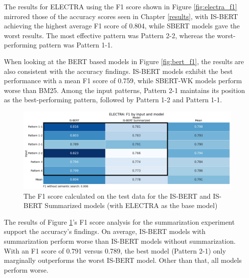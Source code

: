 The results for ELECTRA using the F1 score shown in Figure \ref{fig:electra_f1} mirrored those of the accuracy scores seen in Chapter \ref{results}, with IS-BERT achieving the highest average F1 score of 0.804, while SBERT models gave the worst results. The most effective pattern was Pattern 2-2, whereas the worst-performing pattern was Pattern 1-1.

When looking at the BERT based models in Figure \ref{fig:bert_f1}, the results are also consistent with the accuracy findings. IS-BERT models exhibit the best performance with a mean F1 score of 0.759, while SBERT-WK models perform worse than BM25. Among the input patterns, Pattern 2-1 maintains its position as the best-performing pattern, followed by Pattern 1-2 and Pattern 1-1.

\begin{figure}[h]
\centering
\includegraphics[width = 1\linewidth]{figures/electra_summary_f1.png}
\caption{The F1 score calculated on the test data for the IS-BERT and IS-BERT Summarized models (with ELECTRA as the base model)}
\label{fig:electra_summary_f1}
\end{figure}

The results of Figure \ref{fig:electra_summary_f1}'s F1 score analysis for the summarization experiment support the accuracy's findings. On average, IS-BERT models with summarization perform worse than IS-BERT models without summarization. With an F1 score of 0.791 versus 0.789, the best model (Pattern 2-1) only marginally outperforms the worst IS-BERT model. Other than that, all models perform worse.
